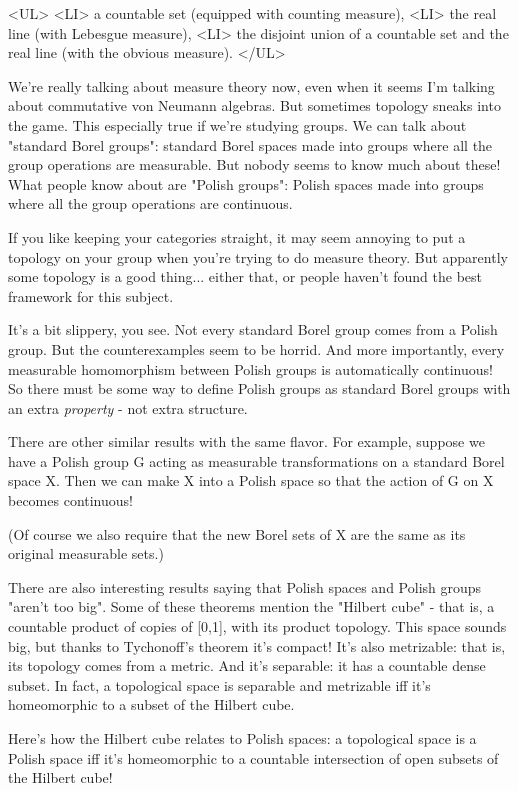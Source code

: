 <UL>
<LI>
a countable set (equipped with counting measure),
<LI>
the real line (with Lebesgue measure),
<LI>
the disjoint union of a countable set and the real line 
(with the obvious measure).
</UL>

We're really talking about measure theory now, even when it seems
I'm talking about commutative von Neumann algebras.  But sometimes
topology sneaks into the game.  This especially true if we're studying 
groups.  We can talk about "standard Borel groups": standard Borel
spaces made into groups where all the group operations are measurable.
But nobody seems to know much about these!  What people know about are
"Polish groups": Polish spaces made into groups where all the group
operations are continuous.  

If you like keeping your categories straight, it may seem annoying to
put a topology on your group when you're trying to do measure theory.
But apparently some topology is a good thing... either that, or people
haven't found the best framework for this subject.

It's a bit slippery, you see.  Not every standard Borel group comes 
from a Polish group.  But the counterexamples seem to be horrid.
And more importantly, every measurable homomorphism between Polish
groups is automatically continuous!  So there must be some way to 
define Polish groups as standard Borel groups with an extra \emph{property} -
not extra structure.

There are other similar results with the same flavor.  For example,
suppose we have a Polish group G acting as measurable transformations 
on a standard Borel space X.  Then we can make X into a Polish space so
that the action of G on X becomes continuous!  

(Of course we also require that the new Borel sets of X are the 
same as its original measurable sets.)

There are also interesting results saying that Polish spaces and
Polish groups "aren't too big".  Some of these theorems mention the
"Hilbert cube" - that is, a countable product of copies of [0,1], 
with its product topology.  This space sounds big, but thanks to 
Tychonoff's theorem it's compact!  It's also metrizable: that is,
its topology comes from a metric.  And it's separable: it has a
countable dense subset.  In fact, a topological space is separable
and metrizable iff it's homeomorphic to a subset of the Hilbert cube.  

Here's how the Hilbert cube relates to Polish spaces: a topological
space is a Polish space iff it's homeomorphic to a countable 
intersection of open subsets of the Hilbert cube!

